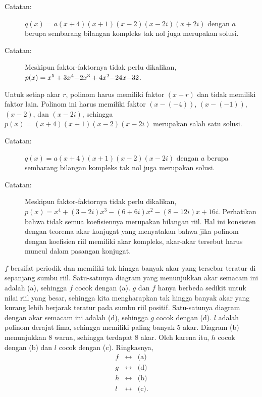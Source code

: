 \begin{description}
\begin{description}
\item [{Catatan:}] $q(x)=a(x+4)(x+1)(x-2)(x-2i)(x+2i)$ dengan $a$ berupa
sembarang bilangan kompleks tak nol juga merupakan solusi.
\item [{Catatan:}] Meskipun faktor-faktornya tidak perlu dikalikan, $p(x)=x^{5}+3x^{4}\text{\textminus}2x^{3}+4x^{2}\text{\textminus}24x\text{\textminus}32$.
\end{description}
\item [{\ref{exc:more-4}:}] Untuk setiap akar $r$, polinom harus memiliki
faktor $(x-r)$ dan tidak memiliki faktor lain. Polinom ini harus
memiliki faktor $(x-(-4))$, $(x-(-1))$, $(x-2)$, dan $(x-2i)$,
sehingga $p(x)=(x+4)(x+1)(x-2)(x-2i)$ merupakan salah satu solusi.

\begin{description}
\item [{Catatan:}] $q(x)=a(x+4)(x+1)(x-2)(x-2i)$ dengan $a$ berupa sembarang
bilangan kompleks tak nol juga merupakan solusi.
\item [{Catatan:}] Meskipun faktor-faktornya tidak perlu dikalikan, $p(x)=x^{4}+(3-2i)x^{3}-(6+6i)x^{2}-(8-12i)x+16i$.
Perhatikan bahwa tidak semua koefisiennya merupakan bilangan riil.
Hal ini konsisten dengan teorema akar konjugat yang menyatakan bahwa
jika polinom dengan koefisien riil memiliki akar kompleks, akar-akar
tersebut harus muncul dalam pasangan konjugat.
\end{description}
\item [{\ref{exc:more-3}:}] $f$ bersifat periodik dan memiliki tak hingga
banyak akar yang tersebar teratur di sepanjang sumbu riil. Satu-satunya
diagram yang menunjukkan akar semacam ini adalah (a), sehingga $f$
cocok dengan (a). $g$ dan $f$ hanya berbeda sedikit untuk nilai
riil yang besar, sehingga kita mengharapkan tak hingga banyak akar
yang kurang lebih berjarak teratur pada sumbu riil positif. Satu-satunya
diagram dengan akar semacam ini adalah (d), sehingga $g$ cocok dengan
(d). $l$ adalah polinom derajat lima, sehingga memiliki paling banyak
5 akar. Diagram (b) menunjukkan 8 warna, sehingga terdapat 8 akar.
Oleh karena itu, $h$ cocok dengan (b) dan $l$ cocok dengan (c).
Ringkasnya,
\begin{eqnarray*}
f & \leftrightarrow & \mbox{(a)}\\
g & \leftrightarrow & \mbox{(d)}\\
h & \leftrightarrow & \mbox{(b)}\\
l & \leftrightarrow & \mbox{(c)}.
\end{eqnarray*}
\end{description}

